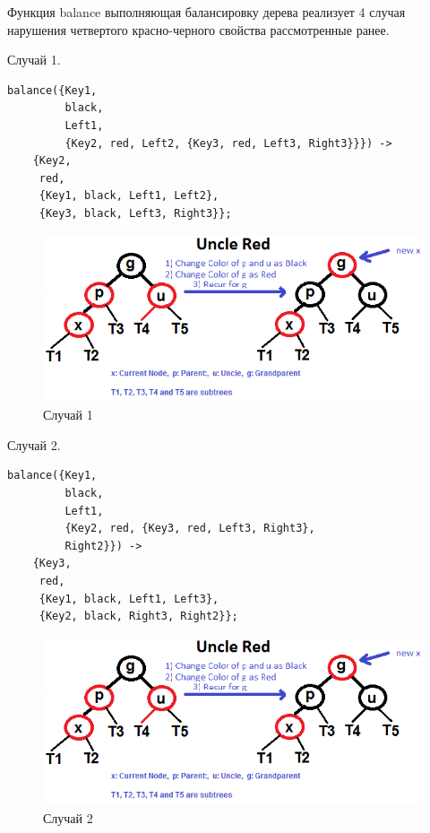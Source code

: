 			Функция balance выполняющая балансировку дерева реализует 4 случая нарушения 
			четвертого красно-черного свойства рассмотренные ранее.
			
			Случай 1.
			\begin{lstlisting}
balance({Key1, 
         black, 
         Left1, 
         {Key2, red, Left2, {Key3, red, Left3, Right3}}}) ->    
    {Key2, 
     red, 
     {Key1, black, Left1, Left2}, 
     {Key3, black, Left3, Right3}};		    
			\end{lstlisting}
			\begin{figure}[H]
				\centering
				\includegraphics[width=\textwidth]{img/tan-aus.png}
				\caption{Случай 1}
			\end{figure}
			
			Случай 2.
			\begin{lstlisting}
balance({Key1, 
         black, 
         Left1, 
         {Key2, red, {Key3, red, Left3, Right3}, 
         Right2}}) ->   
    {Key3, 
     red, 
     {Key1, black, Left1, Left3}, 
     {Key2, black, Right3, Right2}};	    
			\end{lstlisting} 
			\begin{figure}[H]
				\centering
				\includegraphics[width=\textwidth]{img/tan-aus.png}
				\caption{Случай 2}
			\end{figure}
			

